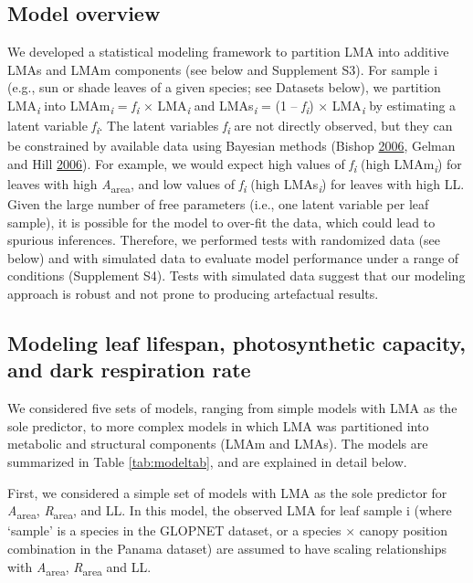 \documentclass[
  12pt,
]{article}
\begin{document}
\hypertarget{model-overview}{%
\subsection{Model overview}\label{model-overview}}

We developed a statistical modeling framework to partition LMA into additive LMAs and LMAm components (see below and Supplement S3).
For sample i (e.g., sun or shade leaves of a given species; see Datasets below), we partition LMA\textsubscript{\emph{i}} into LMAm\textsubscript{\emph{i}} = \emph{f\textsubscript{i}} × LMA\textsubscript{\emph{i}} and LMAs\textsubscript{\emph{i}} = (1 -- \emph{f\textsubscript{i}}) × LMA\textsubscript{\emph{i}} by estimating a latent variable \emph{f\textsubscript{i}}.
The latent variables \emph{f\textsubscript{i}} are not directly observed, but they can be constrained by available data using Bayesian methods (Bishop \protect\hyperlink{ref-Bishop2006}{2006}, Gelman and Hill \protect\hyperlink{ref-Gelman2006}{2006}).
For example, we would expect high values of \emph{f\textsubscript{i}} (high LMAm\textsubscript{\emph{i}}) for leaves with high \emph{A}\textsubscript{area}, and low values of \emph{f\textsubscript{i}} (high LMAs\textsubscript{\emph{i}}) for leaves with high LL.
Given the large number of free parameters (i.e., one latent variable per leaf sample), it is possible for the model to over-fit the data, which could lead to spurious inferences.
Therefore, we performed tests with randomized data (see below) and with simulated data to evaluate model performance under a range of conditions (Supplement S4). Tests with simulated data suggest that our modeling approach is robust and not prone to producing artefactual results.

\hypertarget{modeling-leaf-lifespan-photosynthetic-capacity-and-dark-respiration-rate}{%
\subsection{Modeling leaf lifespan, photosynthetic capacity, and dark respiration rate}\label{modeling-leaf-lifespan-photosynthetic-capacity-and-dark-respiration-rate}}

We considered five sets of models, ranging from simple models with LMA as the sole predictor, to more complex models in which LMA was partitioned into metabolic and structural components (LMAm and LMAs).
The models are summarized in Table \ref{tab:modeltab}, and are explained in detail below.

First, we considered a simple set of models with LMA as the sole predictor for \emph{A}\textsubscript{area}, \emph{R}\textsubscript{area}, and LL.
In this model, the observed LMA for leaf sample i (where `sample' is a species in the GLOPNET dataset, or a species \(\times\) canopy position combination in the Panama dataset) are assumed to have scaling relationships with \emph{A}\textsubscript{area}, \emph{R}\textsubscript{area} and LL.
\end{document}
